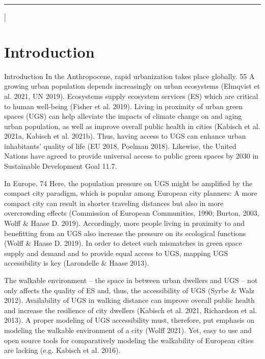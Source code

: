 \documentclass[10pt]{article}
\begin{document}
\vspace*{.5cm}

\hrule

\par\vspace{2ex}]



\vspace{.5cm}

\normalsize


\section{Introduction}

Introduction
In the Anthropocene, rapid urbanization takes place globally. 55%
A growing urban population depends increasingly on urban ecosystems (Elmqvist et al. 2021, UN 2019).
Ecosystems supply ecosystem services (ES) which are critical to human well-being (Fisher et al. 2019). 
Living in proximity of urban green spaces (UGS) can help alleviate the impacts of climate change on and aging urban population, as well as improve overall public health in cities (Kabisch et al. 2021a, Kabisch et al. 2021b).
Thus, having access to UGS can enhance urban inhabitants’ quality of life (EU 2018, Poelman 2018).
Likewise, the United Nations have agreed to provide universal access to public green spaces by 2030 in Sustainable Development Goal 11.7.

In Europe, 74%
Here, the population pressure on UGS might be amplified by the compact city paradigm, which is popular among European city planners: A more compact city can result in shorter traveling distances but also in more overcrowding effects (Commission of European Communities, 1990; Burton, 2003, Wolff \& Haase D. 2019).
Accordingly, more people living in proximity to and benefitting from an UGS also increase the pressure on its ecological functions (Wolff \& Haase D. 2019).
In order to detect such mismatches in green space supply and demand and to provide equal access to UGS, mapping UGS accessibility is key (Larondelle \& Haase 2013).

The walkable environment – the space in between urban dwellers and UGS – not only affects the quality of ES and, thus, the accessibility of UGS (Syrbe \& Walz 2012).
Availability of UGS in walking distance can improve overall public health and increase the resilience of city dwellers (Kabisch et al. 2021, Richardson et al. 2013).
A proper modeling of UGS accessibility must, therefore, put emphasis on modeling the walkable environment of a city (Wolff 2021).
Yet, easy to use and open source tools for comparatively modeling the walkability of European cities are lacking (e.g. Kabisch et al. 2016).
\end{document}
